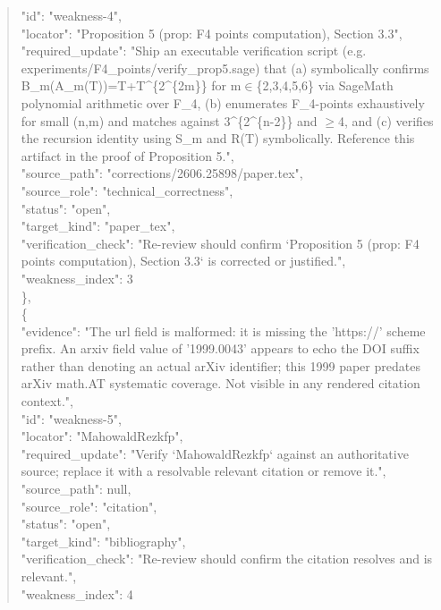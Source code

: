 \documentclass[11pt]{article}
\begin{document}
\begin{quote}
      "id": "weakness-4",\\
      "locator": "Proposition 5 (prop: F4 points computation), Section 3.3",\\
      "required\_update": "Ship an executable verification script (e.g. experiments/F4\_points/verify\_prop5.sage) that (a) symbolically confirms B\_m(A\_m(T))=T+T\^{}\{2\^{}\{2m\}\} for m\ensuremath{\in}\{2,3,4,5,6\} via SageMath polynomial arithmetic over F\_4, (b) enumerates F\_4-points exhaustively for small (n,m) and matches against 3\^{}\{2\^{}\{n-2\}\} and \ensuremath{\ge}4, and (c) verifies the recursion identity using S\_m and R(T) symbolically. Reference this artifact in the proof of Proposition 5.",\\
      "source\_path": "corrections/2606.25898/paper.tex",\\
      "source\_role": "technical\_correctness",\\
      "status": "open",\\
      "target\_kind": "paper\_tex",\\
      "verification\_check": "Re-review should confirm `Proposition 5 (prop: F4 points computation), Section 3.3` is corrected or justified.",\\
      "weakness\_index": 3\\
    \},\\
    \{\\
      "evidence": "The url field is malformed: it is missing the 'https://' scheme prefix. An arxiv field value of '1999.0043' appears to echo the DOI suffix rather than denoting an actual arXiv identifier; this 1999 paper predates arXiv math.AT systematic coverage. Not visible in any rendered citation context.",\\
      "id": "weakness-5",\\
      "locator": "MahowaldRezkfp",\\
      "required\_update": "Verify `MahowaldRezkfp` against an authoritative source; replace it with a resolvable relevant citation or remove it.",\\
      "source\_path": null,\\
      "source\_role": "citation",\\
      "status": "open",\\
      "target\_kind": "bibliography",\\
      "verification\_check": "Re-review should confirm the citation resolves and is relevant.",\\
      "weakness\_index": 4\\

\end{quote}
\end{document}
